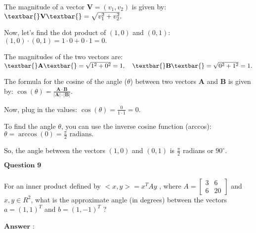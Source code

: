 \documentclass[11pt]{article}
\begin{document}
The magnitude of a vector $\mathbf{V} = (v_1, v_2)$ is given by: $
\textbar{}\mathbf{V}\textbar{} = \sqrt{v_1^2 + v_2^2}. $

Now, let's find the dot product of $(1, 0)$ and $(0, 1)$: $ (1, 0)
\cdot (0, 1) = 1 \cdot 0 + 0 \cdot 1 = 0. $

The magnitudes of the two vectors are: $ \textbar{}\mathbf{A}\textbar{}
= \sqrt{1^2 + 0^2} = 1, \quad \textbar{}\mathbf{B}\textbar{} =
\sqrt{0^2 + 1^2} = 1. $

The formula for the cosine of the angle ($\theta$) between two vectors
$\mathbf{A}$ and $\mathbf{B}$ is given by: $ \cos(\theta) =
\frac{\mathbf{A} \cdot \mathbf{B}}{|\mathbf{A}| \cdot |\mathbf{B}|}. $

Now, plug in the values: $ \cos(\theta) = \frac{0}{1 \cdot 1} = 0. $

To find the angle $\theta$, you can use the inverse cosine function
(arccos): $ \theta = \arccos(0) = \frac{\pi}{2} \text{ radians}. $

So, the angle between the vectors $(1, 0)$ and $(0, 1)$ is
$\frac{\pi}{2}$ radians or $90^\circ$.

    $\textbf{Question 9}$\\
~\\
For an inner product defined by $<x,y>=x^TAy$ , where
$A=\begin{bmatrix} 3 & 6 \\ 6 & 20 \end{bmatrix}$ and $x,y∈R^2$,
what is the approximate angle (in degrees) between the vectors
$a=(1,1)^T$ and $b=(1,−1)^T$ ?\\
~\\
$\textbf{Answer :}$
\end{document}
